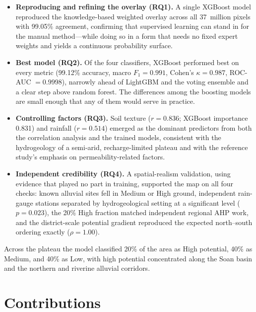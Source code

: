 \begin{itemize}
  \item \textbf{Reproducing and refining the overlay (RQ1).} A single XGBoost
        model reproduced the knowledge-based weighted overlay across all
        37~million pixels with 99.05\% agreement, confirming that supervised
        learning can stand in for the manual method---while doing so in a form
        that needs no fixed expert weights and yields a continuous probability
        surface.

  \item \textbf{Best model (RQ2).} Of the four classifiers, XGBoost performed best
        on every metric (99.12\% accuracy, macro $F_1 = 0.991$, Cohen's
        $\kappa = 0.987$, ROC-AUC $= 0.9998$), narrowly ahead of LightGBM and the
        voting ensemble and a clear step above random forest. The differences
        among the boosting models are small enough that any of them would serve in
        practice.

  \item \textbf{Controlling factors (RQ3).} Soil texture ($r = 0.836$; XGBoost
        importance 0.831) and rainfall ($r = 0.514$) emerged as the dominant
        predictors from both the correlation analysis and the trained models,
        consistent with the hydrogeology of a semi-arid, recharge-limited plateau
        and with the reference study's emphasis on permeability-related factors.

  \item \textbf{Independent credibility (RQ4).} A spatial-realism validation, using
        evidence that played no part in training, supported the map on all four
        checks: known alluvial sites fell in Medium or High ground, independent
        rain-gauge stations separated by hydrogeological setting at a significant
        level ($p = 0.023$), the 20\% High fraction matched independent regional
        AHP work, and the district-scale potential gradient reproduced the expected
        north--south ordering exactly ($\rho = 1.00$).
\end{itemize}

Across the plateau the model classified 20\% of the area as High potential, 40\%
as Medium, and 40\% as Low, with high potential concentrated along the Soan basin
and the northern and riverine alluvial corridors.

\section{Contributions}
\label{sec:concl_contributions}

